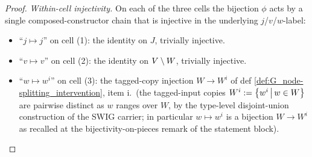 \documentclass[main]{subfiles}
\begin{document}
\begin{proof}
\emph{Within-cell injectivity.}
On each of the three cells the bijection $\phi$ acts by a single composed-constructor chain that is injective in the underlying $j$/$v$/$w$-label:
\begin{itemize}
    \item ``$j \mapsto j$'' on cell (1): the identity on $J$, trivially injective.
    \item ``$v \mapsto v$'' on cell (2): the identity on $V \setminus W$, trivially injective.
    \item ``$w \mapsto w^i$'' on cell (3): the tagged-copy injection $W \to W^i$ of def \ref{def:G_node-splitting_intervention}, item i.\ (the tagged-input copies $W^i := \left \{ w^i \,\middle|\, w \in W \right \}$ are pairwise distinct as $w$ ranges over $W$, by the type-level disjoint-union construction of the SWIG carrier; in particular $w \mapsto w^i$ is a bijection $W \to W^i$ as recalled at the bijectivity-on-pieces remark of the statement block).
\end{itemize}


\end{proof}
\end{document}
